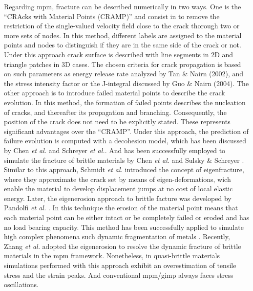 \documentclass[preprint,12pt,a4paper]{elsarticle}
\begin{document}
Regarding \acrshort{mpm}, fracture can be described numerically in
two ways. One is the ``CRAcks with Material Points (CRAMP)''
\cite{Nairn_2003,Nairn_2006} and consist in to remove the restriction
of the single-valued velocity field close to the crack thorough two or
more sets of nodes. In this method, different labels are assigned to the material points
and nodes to distinguish if they are in the same side of the crack or
not. Under this approach crack surface is described with line segments
in 2D and triangle patches in 3D cases. The chosen criteria for crack
propagation is based on such parameters as energy release rate
analyzed by Tan \& Nairn (2002)\cite{Nairn_2002}, and the stress
intensity factor or the J-integral discussed by Guo \& Nairn
(2004)\cite{Nairn_2004}. The other approach is to introduce failed
material points to describe the crack evolution. In this method, the
formation of failed points describes the nucleation of cracks, and
thereafter its propagation and branching. Consequently, the position
of the crack does not need to be explicitly stated. These represents
significant advantages over the ``CRAMP''. Under this approach, the
prediction of failure evolution is computed with a decohesion model,
which has been discussed by Chen {\it et al.}\cite{Zhenmao_2005} and
Schreyer {\it et al.}\cite{Schreyer_2002}. And has been successfully
employed to simulate the fracture of brittle materials by Chen {\it et
  al.} \cite{Chen_2002,Chen_2003} and Sulsky \& Schreyer
\cite{Sulsky_2004}.\\

Similar to this approach, Schmidt {\it et al.}
\cite{Schmidt_2009} introduced the concept of eigenfracture, where
they approximate the crack set by means of eigen-deformations, wich
enable the material to develop displacement jumps at no cost of local
elastic energy. Later, the eigenerosion approach to brittle facture
was developed by Pandolfi {\it et al.}
\cite{Pandolfi_2012,Pandolfi_2013}. In this technique the erosion of
the material point means that each material point can be either intact or be completely failed or eroded and has no load bearing
capacity. This method has been successfully applied to simulate high
complex phenomena such dynamic fragmentation of metals
\cite{Li_2015}. Recently, Zhang {\it et al.}
\cite{Zhang_EE_2020} adopted the eigenerosion to resolve the dynamic
fracture of brittle materials in the \acrshort{mpm}
framework. Nonetheless, in quasi-brittle materials simulations
performed with this approach exhibit an overestimation of tensile
stress and the strain peaks. And conventional \acrshort{mpm}/\acrshort{gimp} always
faces stress oscillations.\\
\end{document}
